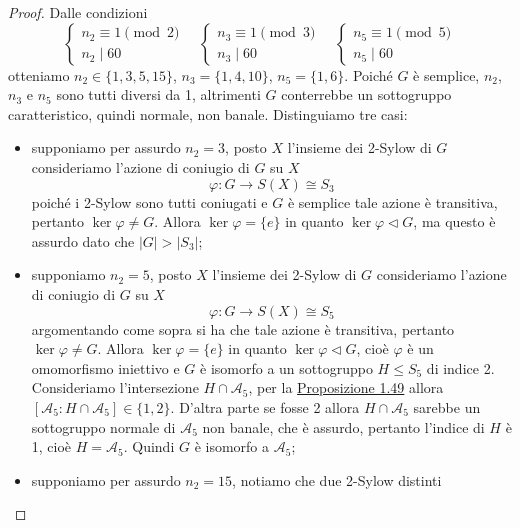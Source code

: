\documentclass[11pt]{scrartcl}
\begin{document}
\begin{proof}
    Dalle condizioni
    \[
        \begin{cases}
            n_2 \equiv 1 \pmod 2\\
            n_2 \mid 60
        \end{cases}
        \quad
        \begin{cases}
            n_3 \equiv 1 \pmod 3\\
            n_3 \mid 60
        \end{cases}
        \quad
        \begin{cases}
            n_5 \equiv 1 \pmod 5\\
            n_5 \mid 60
        \end{cases}
    \]
    otteniamo $n_2 \in \{1, 3, 5, 15\}$, $n_3 = \{1, 4, 10\}$, $n_5 = \{1, 6\}$.
    Poiché $G$ è semplice, $n_2$, $n_3$ e $n_5$ sono tutti diversi da 1,
    altrimenti $G$ conterrebbe un sottogruppo caratteristico, quindi normale,
    non banale. Distinguiamo tre casi:
    \begin{itemize}
        \item supponiamo per assurdo $n_2 = 3$, posto $X$ l'insieme dei 2-Sylow di $G$
        consideriamo l'azione di coniugio di $G$ su $X$
        \[
            \varphi: G \longrightarrow S(X) \cong S_3
        \]
        poiché i 2-Sylow sono tutti coniugati e $G$ è semplice tale azione è 
        transitiva, pertanto $\ker\varphi \neq G$. Allora $\ker\varphi = \{e\}$ 
        in quanto $\ker\varphi\triangleleft G$,
        ma questo è assurdo dato che $|G| > |S_3|$;
        \item supponiamo $n_2 = 5$, posto $X$ l'insieme dei 2-Sylow di $G$
        consideriamo l'azione di coniugio di $G$ su $X$
        \[
            \varphi: G \longrightarrow S(X) \cong S_5
        \]
        argomentando come sopra si ha che tale azione è transitiva, pertanto
        $\ker\varphi \neq G$. Allora $\ker\varphi = \{e\}$ in quanto 
        $\ker\varphi \triangleleft G$, cioè $\varphi$ è un omomorfismo iniettivo
        e $G$ è isomorfo a un sottogruppo $H\leqslant S_5$ di indice 2. Consideriamo
        l'intersezione $H \cap \mathcal{A}_5$, per la \hyperref[prop1.49]{Proposizione 1.49}
        allora $[\mathcal{A}_5:H\cap\mathcal{A}_5] \in \{1, 2\}$. D'altra parte
        se fosse 2 allora $H\cap\mathcal{A}_5$ sarebbe un sottogruppo normale di $\mathcal{A}_5$
        non banale, che è assurdo, pertanto l'indice di $H$ è 1, cioè $H = \mathcal{A}_5$.
        Quindi $G$ è isomorfo a $\mathcal{A}_5$;
        \item supponiamo per assurdo $n_2 = 15$, notiamo che due 2-Sylow distinti

\end{itemize}
\end{proof}
\end{document}
